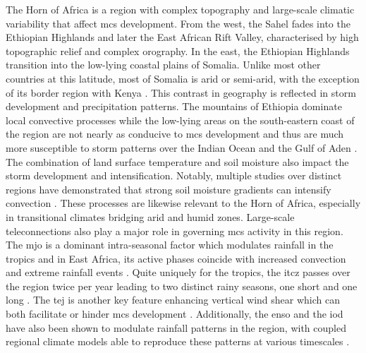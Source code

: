 The Horn of Africa is a region with complex topography and large-scale climatic variability that affect \acrshort{mcs} development. From the west, the Sahel fades into the Ethiopian Highlands and later the East African Rift Valley, characterised by high topographic relief and complex orography. In the east, the Ethiopian Highlands transition into the low-lying coastal plains of Somalia. Unlike most other countries at this latitude, most of Somalia is arid or semi-arid, with the exception of its border region with Kenya \citep{Beck2023}. This contrast in geography is reflected in storm development and precipitation patterns. The mountains of Ethiopia dominate local convective processes \citep{Negash2024} while the low-lying areas on the south-eastern coast of the region are not nearly as conducive to \acrshort{mcs} development and thus are much more susceptible to storm patterns over the Indian Ocean and the Gulf of Aden \citep{Camberlin2024}. The combination of land surface temperature and soil moisture also impact the storm development and intensification. Notably, multiple studies over distinct regions have demonstrated that strong soil moisture gradients can intensify convection \citep{Barton2021,Klein2020,Taylor2017}. These processes are likewise relevant to the Horn of Africa, especially in transitional climates bridging arid and humid zones. Large-scale \glspl{teleconnection} also play a major role in governing \acrshort{mcs} activity in this region. The \acrfull{mjo} is a dominant intra-seasonal factor which modulates rainfall in the tropics and in East Africa, its active phases coincide with increased convection and extreme rainfall events \citep{Camberlin2019,Ochieng2023,Pohl2006}. Quite uniquely for the tropics, the \acrfull{itcz} passes over the region twice per year leading to two distinct rainy seasons, one short and one long \citep{Palmer2023,Tefera2025}. The \acrfull{tej} is another key feature enhancing vertical wind shear which can both facilitate or hinder \acrshort{mcs} development \citep{Farnsworth2011,Vashisht2021}. Additionally, the \acrfull{enso} and the \acrfull{iod} have also been shown to modulate rainfall patterns in the region, with coupled regional climate models able to reproduce these patterns at various timescales \citep{Dubache2019,Endris2019,Vashisht2021,Zaroug2014}. 

